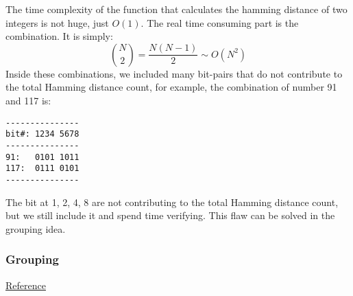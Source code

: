 \documentclass[12pt]{article}
\begin{document}
The time complexity of the function that calculates the hamming distance of two integers is not huge, just \(O(1)\). The real time consuming part is the combination. It is simply:
\[
{N \choose 2} = \frac{N(N-1)}{2} \sim O(N^2)
\]
Inside these combinations, we included many bit-pairs that do not contribute to the total Hamming distance count, for example, the combination of number 91 and 117 is:
\begin{verbatim}
---------------
bit#: 1234 5678
---------------
91:   0101 1011
117:  0111 0101
---------------
\end{verbatim}
The bit at 1, 2, 4, 8 are not contributing to the total Hamming distance count, but we still include it and spend time verifying. This flaw can be solved in the grouping idea.

\subsubsection{Grouping}
\label{sec:orgc3be45e}
\href{https://leetcode.com/problems/total-hamming-distance/discuss/96250/C++-O(n)-runtime-O(1)-space}{Reference}
\end{document}
